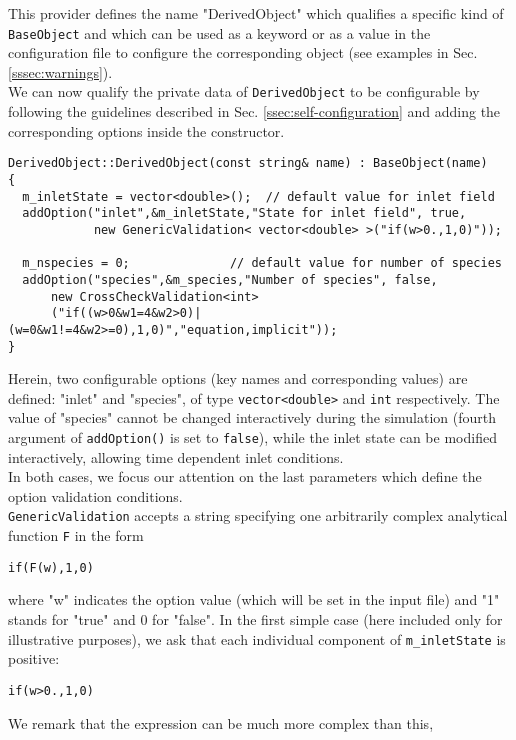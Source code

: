 \documentclass[11pt]{article}
\newcommand{\noi}{\noindent}
\begin{document}
\noi
This provider defines the name "DerivedObject" which qualifies a specific
kind of \texttt{BaseObject} and which can be used as a keyword or as a
value in the configuration file to configure the corresponding 
object (see examples in Sec. \ref{sssec:warnings}).\\
We can now qualify the private data of \texttt{DerivedObject} to be
configurable by following the guidelines described in 
Sec. \ref{ssec:self-configuration} and adding the corresponding
options inside the constructor.
\begin{lstlisting}[basicstyle={\small\sffamily},float=!htb,caption={DerivedObject
    constructor.}, label=clist:DerivedObjectConstrutor]
DerivedObject::DerivedObject(const string& name) : BaseObject(name)
{  
  m_inletState = vector<double>();  // default value for inlet field
  addOption("inlet",&m_inletState,"State for inlet field", true,
            new GenericValidation< vector<double> >("if(w>0.,1,0)"));
            
  m_nspecies = 0;              // default value for number of species
  addOption("species",&m_species,"Number of species", false, 
      new CrossCheckValidation<int>
      ("if((w>0&w1=4&w2>0)|(w=0&w1!=4&w2>=0),1,0)","equation,implicit"));
}
\end{lstlisting}
\noi
Herein, two configurable options (key names and corresponding values) are defined:
"inlet" and "species", of type \texttt{vector<double>} and \texttt{int}
respectively. The value of "species" cannot be changed interactively 
during the simulation (fourth argument of \texttt{addOption()}
is set to \texttt{false}), while the inlet state can be modified
interactively, allowing time dependent inlet conditions. \\
In both cases, we focus our attention on the last parameters which 
define the option validation conditions. \\
\texttt{GenericValidation} accepts a string specifying one
arbitrarily complex analytical function \texttt{F} in the form
\begin{verbatim}
if(F(w),1,0)
\end{verbatim}
where "w" indicates the option value (which will be set in the input
file) and "1" stands for "true" and 0 for "false". In the first simple
case (here included only for illustrative purposes), we ask that each individual 
component of \texttt{m\_inletState} is positive:
\begin{verbatim}
if(w>0.,1,0)
\end{verbatim}
We remark that the expression can be much more complex than this,
\end{document}
